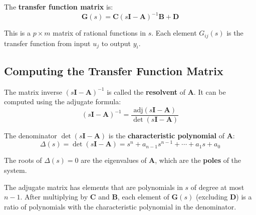 The \textbf{transfer function matrix} is:
\begin{equation}
\boxed{\mathbf{G}(s) = \mathbf{C}(s\mathbf{I} - \mathbf{A})^{-1}\mathbf{B} + \mathbf{D}}
\label{eq:transfer_function_matrix}
\end{equation}

This is a $p \times m$ matrix of rational functions in $s$. Each element $G_{ij}(s)$ is the transfer function from input $u_j$ to output $y_i$.

\subsection{Computing the Transfer Function Matrix}

The matrix inverse $(s\mathbf{I} - \mathbf{A})^{-1}$ is called the \textbf{resolvent} of $\mathbf{A}$. It can be computed using the adjugate formula:
\begin{equation}
(s\mathbf{I} - \mathbf{A})^{-1} = \frac{\text{adj}(s\mathbf{I} - \mathbf{A})}{\det(s\mathbf{I} - \mathbf{A})}
\end{equation}

The denominator $\det(s\mathbf{I} - \mathbf{A})$ is the \textbf{characteristic polynomial} of $\mathbf{A}$:
\begin{equation}
\Delta(s) = \det(s\mathbf{I} - \mathbf{A}) = s^n + a_{n-1}s^{n-1} + \cdots + a_1 s + a_0
\end{equation}

The roots of $\Delta(s) = 0$ are the eigenvalues of $\mathbf{A}$, which are the \textbf{poles} of the system.

The adjugate matrix has elements that are polynomials in $s$ of degree at most $n-1$. After multiplying by $\mathbf{C}$ and $\mathbf{B}$, each element of $\mathbf{G}(s)$ (excluding $\mathbf{D}$) is a ratio of polynomials with the characteristic polynomial in the denominator.

